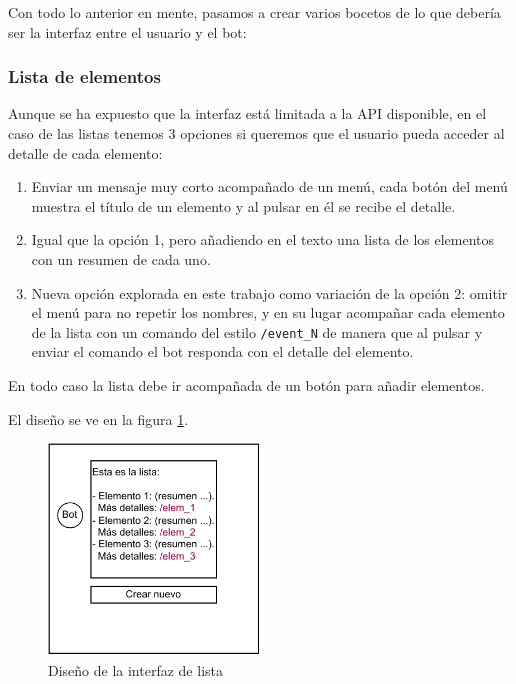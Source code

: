 Con todo lo anterior en mente, pasamos a crear varios bocetos de lo que debería ser la interfaz entre el usuario y el bot:

\subsubsection{Lista de elementos}

Aunque se ha expuesto que la interfaz está limitada a la API disponible, en el caso de las listas tenemos 3 opciones si queremos que el usuario pueda acceder al detalle de cada elemento:
\begin{enumerate}
    \item Enviar un mensaje muy corto acompañado de un menú, cada botón del menú muestra el título de un elemento y al pulsar en él se recibe el detalle.
    \item Igual que la opción 1, pero añadiendo en el texto una lista de los elementos con un resumen de cada uno.
    \item Nueva opción explorada en este trabajo como variación de la opción 2: omitir el menú para no repetir los nombres, y en su lugar acompañar cada elemento de la lista con un comando del estilo \texttt{/event\_N} de manera que al pulsar y enviar el comando el bot responda con el detalle del elemento.
\end{enumerate}

En todo caso la lista debe ir acompañada de un botón para añadir elementos.

El diseño se ve en la figura \ref{fig:disenyo_lista}.

\begin{figure}[h]
\centering
\includegraphics[width=0.5\textwidth]{imagenes/disenyo_interfaz/lista.drawio.pdf}
\caption{Diseño de la interfaz de lista}
\label{fig:disenyo_lista}
\end{figure}


